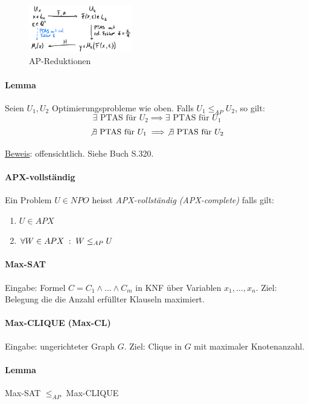 \begin{figure}[h]
    \centering
    \includegraphics[width=0.4\textwidth]{images/ap-reduktionen.png}
    \caption{AP-Reduktionen}
\end{figure}

\paragraph{Lemma}
Seien $U_1, U_2$ Optimierungsprobleme wie oben.
Falls $U_1 \leq_{AP} U_2$, so gilt:
$$ \exists \text{ PTAS für } U_2 \implies \exists \text{ PTAS für } U_1 $$
$$ \not \exists \text{ PTAS für } U_1 \implies \not \exists \text{ PTAS für } U_2 $$

\underline{Beweis}: offensichtlich. Siehe Buch S.320.

\paragraph{APX-vollständig}
Ein Problem $U \in NPO$ heisst \emph{APX-vollständig (APX-complete)} falls gilt:
\begin{enumerate}
    \item $U \in APX$
    \item $\forall W \in APX \; : \; W \leq_{AP} U$
\end{enumerate}

\paragraph{Max-SAT}
Eingabe: Formel $C = C_1 \wedge ... \wedge C_m$ in KNF über Variablen $x_1, ..., x_n$.
Ziel: Belegung die die Anzahl erfüllter Klauseln maximiert.

\paragraph{Max-CLIQUE (Max-CL)}
Eingabe: ungerichteter Graph $G$.
Ziel: Clique in $G$ mit maximaler Knotenanzahl.

\paragraph{Lemma}
Max-SAT $\leq_{AP}$ Max-CLIQUE

